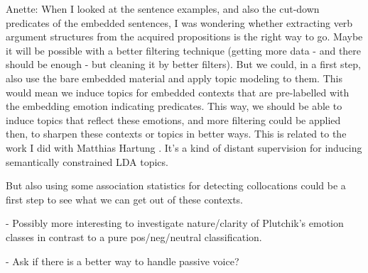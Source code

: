 Anette:
When I looked at the sentence examples, and also the cut-down predicates of the embedded sentences, I was wondering whether extracting verb argument structures from the acquired propositions is the right way to go. Maybe it will be possible with a better filtering technique (getting more data - and there should be enough - but cleaning it by better filters). But we could, in a first step, also use the bare embedded material and apply topic modeling to them. This would mean we induce topics for embedded contexts that are pre-labelled with the embedding emotion indicating predicates. This way, we should be able to induce topics that reflect these emotions, and more filtering could be applied then, to sharpen these contexts or topics in better ways. This is related to the work I did with Matthias Hartung \cite{hartung2011exploring}. It's a kind of distant supervision for inducing semantically constrained LDA topics.

But also using some association statistics for detecting collocations could be a first step to see what we can get out of these contexts.


- Possibly more interesting to investigate nature/clarity of Plutchik's emotion classes in contrast to a pure pos/neg/neutral classification. 

- Ask if there is a better way to handle passive voice?








